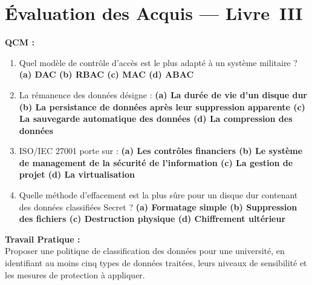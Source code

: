 \section{Évaluation des Acquis --- Livre~III}

\begin{boxexo}
\textbf{QCM :}
\begin{enumerate}
    \item Quel modèle de contrôle d'accès est le plus adapté à un système militaire ? \textbf{(a) DAC \quad (b) RBAC \quad (c) MAC \quad (d) ABAC}
    \item La rémanence des données désigne : \textbf{(a) La durée de vie d'un disque dur \quad (b) La persistance de données après leur suppression apparente \quad (c) La sauvegarde automatique des données \quad (d) La compression des données}
    \item ISO/IEC 27001 porte sur : \textbf{(a) Les contrôles financiers \quad (b) Le système de management de la sécurité de l'information \quad (c) La gestion de projet \quad (d) La virtualisation}
    \item Quelle méthode d'effacement est la plus sûre pour un disque dur contenant des données classifiées Secret ? \textbf{(a) Formatage simple \quad (b) Suppression des fichiers \quad (c) Destruction physique \quad (d) Chiffrement ultérieur}
\end{enumerate}

\textbf{Travail Pratique :}\\
Proposer une politique de classification des données pour une université, en identifiant au moins cinq types de données traitées, leurs niveaux de sensibilité et les mesures de protection à appliquer.
\end{boxexo}
